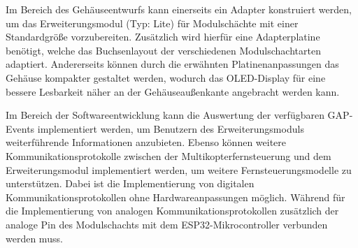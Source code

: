 Im Bereich des Gehäuseentwurfs kann einerseits ein Adapter konstruiert werden, um das Erweiterungsmodul (Typ: Lite) für Modulschächte mit einer Standardgröße vorzubereiten. Zusätzlich wird hierfür eine Adapterplatine benötigt, welche das Buchsenlayout der verschiedenen Modulschachtarten adaptiert. Andererseits können durch die erwähnten Platinenanpassungen das Gehäuse kompakter gestaltet werden, wodurch das \acs{OLED}-Display für eine bessere Lesbarkeit näher an der Gehäuseaußenkante angebracht werden kann.

Im Bereich der Softwareentwicklung kann die Auswertung der verfügbaren \ac{GAP}-Events implementiert werden, um Benutzern des Erweiterungsmoduls weiterführende Informationen anzubieten. Ebenso können weitere Kommunikationsprotokolle zwischen der Multikopterfernsteuerung und dem Erweiterungsmodul implementiert werden, um weitere Fernsteuerungsmodelle zu unterstützen. Dabei ist die Implementierung von digitalen Kommunikationsprotokollen ohne Hardwareanpassungen möglich. Während für die Implementierung von analogen Kommunikationsprotokollen zusätzlich der analoge Pin des Modulschachts mit dem ESP32-Mikrocontroller verbunden werden muss.